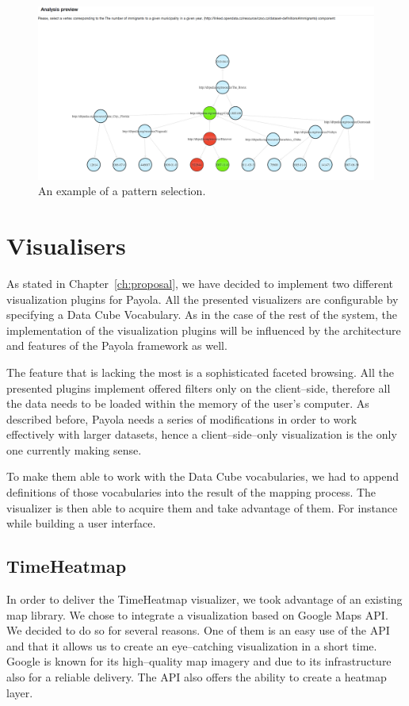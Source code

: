 \begin{figure}
	\centering
	\includegraphics[width=140mm]{img/pattern-selection.png}
	\caption{An example of a pattern selection.}
	\label{fig:pattern-selection}
\end{figure}

\section{Visualisers}
As stated in Chapter~\ref{ch:proposal}, we have decided to implement two 
different visualization plugins for Payola. All the presented 
visualizers are configurable by specifying a Data Cube Vocabulary.
As in the case of the rest of the 
system, the implementation of the visualization plugins will be influenced 
by the architecture and features of the Payola framework as well.

The feature that is lacking the most  is a sophisticated faceted browsing. All the presented plugins 
implement offered filters only on the client--side, therefore all the data needs 
to be loaded within the memory of the user’s computer. As described before, Payola 
needs a series of modifications in order to work effectively with larger 
datasets, hence a client--side--only visualization is the only one currently making sense.

To make them able to work with the Data Cube vocabularies, we had to append 
definitions of those vocabularies into the result of the mapping process. The 
visualizer is then able to acquire them and take advantage of them. For instance 
while building a user interface.

\subsection{TimeHeatmap}
In order to deliver the TimeHeatmap visualizer, we took advantage of an existing 
map library. We chose to integrate a visualization based on Google Maps API. We 
decided to do so for several reasons. One of them is an easy use of the API and that it allows us to
create an eye--catching visualization in a short 
time. Google is known for its high--quality map imagery and due to its 
infrastructure also for a reliable delivery. The API also offers the ability to create a heatmap layer.

